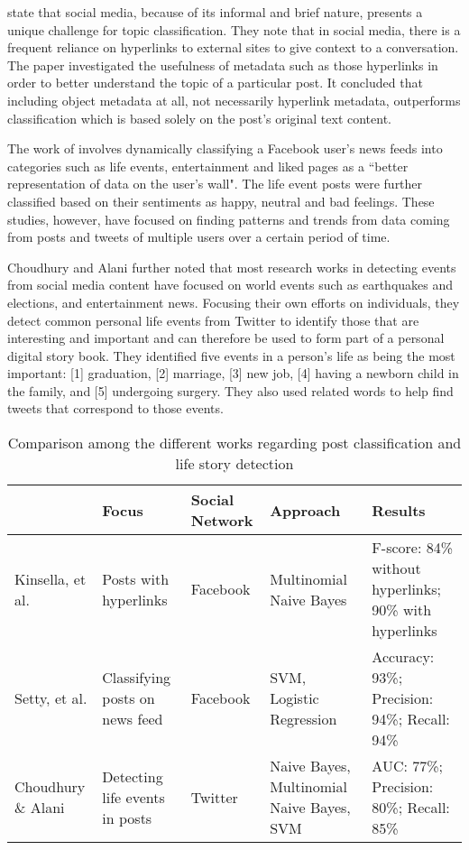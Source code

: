 \cite{DBLP:conf/ecir/KinsellaPB11} state that social media, because of its informal and brief nature, presents a unique challenge for topic classification. They note that in social media, there is a frequent reliance on hyperlinks to external sites to give context to a conversation. The paper investigated the usefulness of metadata such as those hyperlinks in order to better understand the topic of a particular post. It concluded that including object metadata at all, not necessarily hyperlink metadata, outperforms classification which is based solely on the post's original text content. 

The work of \cite{setty2014classification} involves dynamically classifying a Facebook user's news feeds into categories such as life events, entertainment and liked pages as a ``better representation of data on the user's wall". The life event posts were further classified based on their sentiments as happy, neutral and bad feelings. These studies, however, have focused on finding patterns and trends from data coming from posts and tweets of multiple users over a certain period of time. 

Choudhury and Alani \citeyear{choudhury2014personal} further noted that most research works in detecting events from social media content have focused on world events such as earthquakes and elections, and entertainment news. Focusing their own efforts on individuals, they detect common personal life events from Twitter to identify those that are interesting and important and can therefore be used to form part of a personal digital story book. They identified five events in a person's life as being the most important: [1] graduation, [2] marriage, [3] new job, [4] having a newborn child in the family, and [5] undergoing surgery. They also used related words to help find tweets that correspond to those events.

\clearpage
\begin{sidewaystable}[ph!]   %
	\centering
	\caption{Comparison among the different works regarding post classification and life story detection} \vspace{0.25em}
	\begin{tabular}{|p{1.5in}|p{1.5in}|p{1.5in}|p{1.5in}|p{1.5in}|} \hline
		\centering  & Focus & Social Network & Approach & Results \\ \hline
		Kinsella, et al. \citeyear{DBLP:conf/ecir/KinsellaPB11} & Posts with hyperlinks & Facebook & Multinomial Naive Bayes & F-score: 84\% without hyperlinks; 90\% with hyperlinks \\ \hline
		Setty, et al. \citeyear{setty2014classification} & Classifying posts on news feed & Facebook & SVM, Logistic Regression & Accuracy: 93\%; Precision: 94\%; Recall: 94\% \\ \hline
		Choudhury \& Alani \citeyear{choudhury2014personal} & Detecting life events in posts & Twitter & Naive Bayes, Multinomial Naive Bayes, SVM & AUC: 77\%; Precision: 80\%; Recall: 85\% \\ \hline
	\end{tabular}
	\label{tab:KnowledgeBase}
\end{sidewaystable}
\clearpage